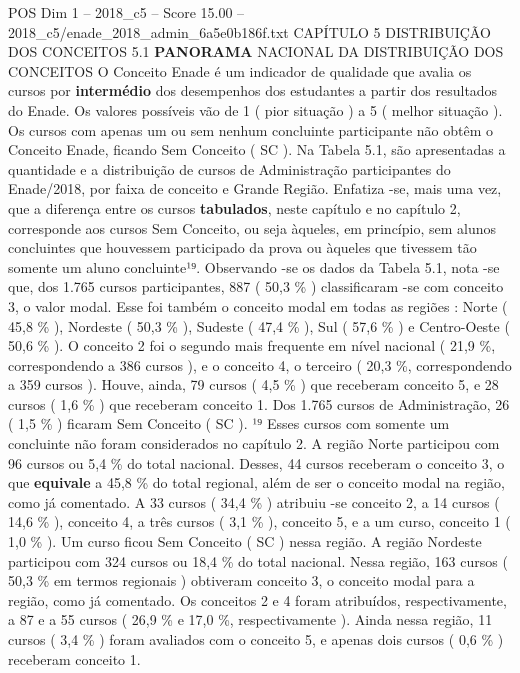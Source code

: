 \begin{textsample}{POS Dim 1 – 2018\_c5 – Score 15.00 – 2018\_c5/enade\_2018\_admin\_6a5e0b186f.txt}  \label{ex:f1_pos_067}
CAPÍTULO 5 DISTRIBUIÇÃO DOS CONCEITOS 5.1 \textbf{PANORAMA} NACIONAL DA DISTRIBUIÇÃO DOS CONCEITOS O Conceito Enade é um indicador de qualidade que avalia os cursos por \textbf{intermédio} dos desempenhos dos estudantes a partir dos resultados do Enade.
Os valores possíveis vão de 1 ( pior situação ) a 5 ( melhor situação ).
Os cursos com apenas um ou sem nenhum concluinte participante não obtêm o Conceito Enade, ficando Sem Conceito ( SC ).
Na Tabela 5.1, são apresentadas a quantidade e a distribuição de cursos de Administração participantes do Enade/2018, por faixa de conceito e Grande Região.
Enfatiza -se, mais uma vez, que a diferença entre os cursos \textbf{tabulados}, neste capítulo e no capítulo 2, corresponde aos cursos Sem Conceito, ou seja àqueles, em princípio, sem alunos concluintes que houvessem participado da prova ou àqueles que tivessem tão somente um aluno concluinte¹⁹.
Observando -se os dados da Tabela 5.1, nota -se que, dos 1.765 cursos participantes, 887 ( 50,3 \% ) classificaram -se com conceito 3, o valor modal.
Esse foi também o conceito modal em todas as regiões : Norte ( 45,8 \% ), Nordeste ( 50,3 \% ), Sudeste ( 47,4 \% ), Sul ( 57,6 \% ) e Centro-Oeste ( 50,6 \% ).
O conceito 2 foi o segundo mais frequente em nível nacional ( 21,9 \%, correspondendo a 386 cursos ), e o conceito 4, o terceiro ( 20,3 \%, correspondendo a 359 cursos ).
Houve, ainda, 79 cursos ( 4,5 \% ) que receberam conceito 5, e 28 cursos ( 1,6 \% ) que receberam conceito 1.
Dos 1.765 cursos de Administração, 26 ( 1,5 \% ) ficaram Sem Conceito ( SC ). ¹⁹ Esses cursos com somente um concluinte não foram considerados no capítulo 2.
A região Norte participou com 96 cursos ou 5,4 \% do total nacional.
Desses, 44 cursos receberam o conceito 3, o que \textbf{equivale} a 45,8 \% do total regional, além de ser o conceito modal na região, como já comentado.
A 33 cursos ( 34,4 \% ) atribuiu -se conceito 2, a 14 cursos ( 14,6 \% ), conceito 4, a três cursos ( 3,1 \% ), conceito 5, e a um curso, conceito 1 ( 1,0 \% ).
Um curso ficou Sem Conceito ( SC ) nessa região.
A região Nordeste participou com 324 cursos ou 18,4 \% do total nacional.
Nessa região, 163 cursos ( 50,3 \% em termos regionais ) obtiveram conceito 3, o conceito modal para a região, como já comentado.
Os conceitos 2 e 4 foram atribuídos, respectivamente, a 87 e a 55 cursos ( 26,9 \% e 17,0 \%, respectivamente ).
Ainda nessa região, 11 cursos ( 3,4 \% ) foram avaliados com o conceito 5, e apenas dois cursos ( 0,6 \% ) receberam conceito 1.

\end{textsample}
